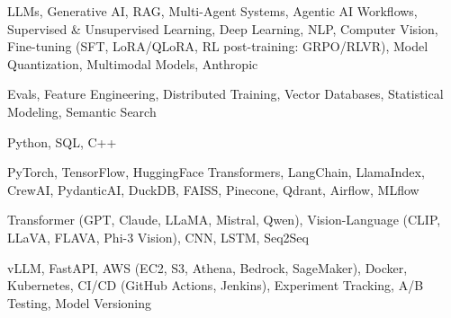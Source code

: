 \documentclass[letter,10pt]{article}
\begin{document}
 LLMs, Generative AI, RAG, Multi-Agent Systems, Agentic AI Workflows, Supervised \& Unsupervised Learning, Deep Learning, NLP, Computer Vision, Fine-tuning (SFT, LoRA/QLoRA, RL post-training: GRPO/RLVR), Model Quantization, Multimodal Models, Anthropic\par\vspace{2pt}

 Evals, Feature Engineering, Distributed Training, Vector Databases, Statistical Modeling, Semantic Search\par\vspace{2pt}

 Python, SQL, C++\par\vspace{2pt}

 PyTorch, TensorFlow, HuggingFace Transformers, LangChain, LlamaIndex, CrewAI, PydanticAI, DuckDB, FAISS, Pinecone, Qdrant, Airflow, MLflow\par\vspace{2pt}

 Transformer (GPT, Claude, LLaMA, Mistral, Qwen), Vision-Language (CLIP, LLaVA, FLAVA, Phi-3 Vision), CNN, LSTM, Seq2Seq\par\vspace{2pt}

 vLLM, FastAPI, AWS (EC2, S3, Athena, Bedrock, SageMaker), Docker, Kubernetes, CI/CD (GitHub Actions, Jenkins), Experiment Tracking, A/B Testing, Model Versioning
\end{document}
